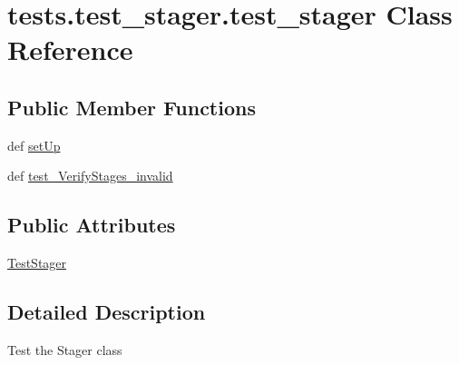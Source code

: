 \hypertarget{classtests_1_1test__stager_1_1test__stager}{\section{tests.\-test\-\_\-stager.\-test\-\_\-stager \-Class \-Reference}
\label{classtests_1_1test__stager_1_1test__stager}
}
\subsection*{\-Public \-Member \-Functions}
\begin{DoxyCompactItemize}
\item 
def \hyperlink{classtests_1_1test__stager_1_1test__stager_a0069767a599bb35aeebc18e29bc75750}{set\-Up}
\item 
def \hyperlink{classtests_1_1test__stager_1_1test__stager_a47fec33e2bf3e4d5f7312c3700e38153}{test\-\_\-\-Verify\-Stages\-\_\-invalid}
\end{DoxyCompactItemize}
\subsection*{\-Public \-Attributes}
\begin{DoxyCompactItemize}
\item 
\hyperlink{classtests_1_1test__stager_1_1test__stager_a375d01a94ded6729e0c907d578b6378d}{\-Test\-Stager}
\end{DoxyCompactItemize}


\subsection{\-Detailed \-Description}
\begin{DoxyVerb}Test the Stager class\end{DoxyVerb}
 

